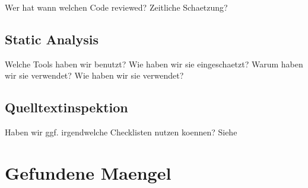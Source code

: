 \documentclass[12pt,DIV14,BCOR10mm,a4paper,twoside,parskip=half-,headsepline,headinclude,english,ngerman,bibliography=totocnumbered]{scrreprt}
\begin{document}
Wer hat wann welchen Code reviewed?
Zeitliche Schaetzung?

\section{Static Analysis}

Welche Tools haben wir benutzt?
Wie haben wir sie eingeschaetzt?
Warum haben wir sie verwendet?
Wie haben wir sie verwendet?

\section{Quelltextinspektion}

Haben wir ggf. irgendwelche Checklisten nutzen koennen?
Siehe

\chapter{Gefundene Maengel}

\printbibliography

\printacronyms[title=Abkürzungsverzeichnis,toctitle=Abkürzungsverzeichnis]
\printglossary[type=main]

\listoffigures      %

\end{document}
